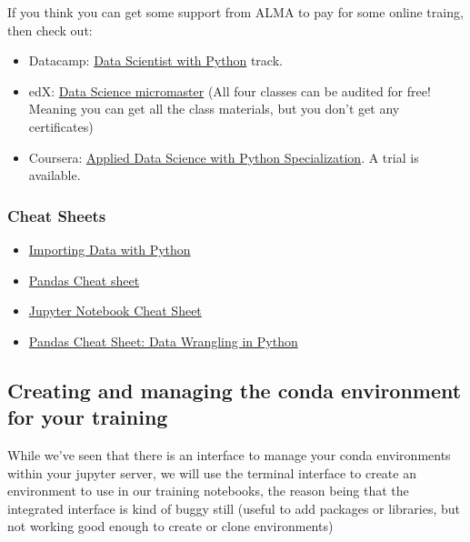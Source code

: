 \documentclass[11pt]{article}
\providecommand{\tightlist}{%
      \setlength{\itemsep}{0pt}\setlength{\parskip}{0pt}}
\begin{document}
If you think you can get some support from ALMA to pay for some online
traing, then check out:

\begin{itemize}
\tightlist
\item
  Datacamp:
  \href{https://www.datacamp.com/tracks/data-scientist-with-python}{Data
  Scientist with Python} track.
\item
  edX: \href{https://www.edx.org/micromasters/data-science}{Data Science
  micromaster} (All four classes can be audited for free! Meaning you
  can get all the class materials, but you don't get any certificates)
\item
  Coursera:
  \href{https://courses.edx.org/course_modes/choose/course-v1:UCSanDiegoX+DSE210x+1T2018/}{Applied
  Data Science with Python Specialization}. A trial is available.
\end{itemize}

\subsubsection{Cheat Sheets}\label{cheat-sheets}

\begin{itemize}
\tightlist
\item
  \href{http://datacamp-community.s3.amazonaws.com/50d31142-3de0-4159-89b9-18b718a728ef}{Importing
  Data with Python}
\item
  \href{http://datacamp-community.s3.amazonaws.com/fbc502d0-46b2-4e1b-b6b0-5402ff273251}{Pandas
  Cheat sheet}
\item
  \href{http://datacamp-community.s3.amazonaws.com/48093c40-5303-45f4-bbf9-0c96c0133c40}{Jupyter
  Notebook Cheat Sheet}
\item
  \href{http://datacamp-community.s3.amazonaws.com/9f0f2ae1-8bd8-4302-a67b-e17f3059d9e8}{Pandas
  Cheat Sheet: Data Wrangling in Python}
\end{itemize}

\subsection{Creating and managing the conda environment for your
training}\label{creating-and-managing-the-conda-environment-for-your-training}

While we've seen that there is an interface to manage your conda
environments within your jupyter server, we will use the terminal
interface to create an environment to use in our training notebooks, the
reason being that the integrated interface is kind of buggy still
(useful to add packages or libraries, but not working good enough to
create or clone environments)
\end{document}
